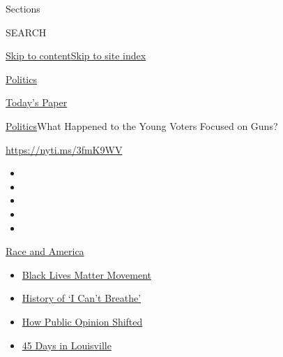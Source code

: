 Sections

SEARCH

\protect\hyperlink{site-content}{Skip to
content}\protect\hyperlink{site-index}{Skip to site index}

\href{https://www.nytimes3xbfgragh.onion/section/politics}{Politics}

\href{https://myaccount.nytimes3xbfgragh.onion/auth/login?response_type=cookie\&client_id=vi}{}

\href{https://www.nytimes3xbfgragh.onion/section/todayspaper}{Today's
Paper}

\href{/section/politics}{Politics}\textbar{}What Happened to the Young
Voters Focused on Guns?

\url{https://nyti.ms/3fmK9WV}

\begin{itemize}
\item
\item
\item
\item
\item
\end{itemize}

\href{https://www.nytimes3xbfgragh.onion/news-event/george-floyd-protests-minneapolis-new-york-los-angeles?action=click\&pgtype=Article\&state=default\&region=TOP_BANNER\&context=storylines_menu}{Race
and America}

\begin{itemize}
\tightlist
\item
  \href{https://www.nytimes3xbfgragh.onion/interactive/2020/07/03/us/george-floyd-protests-crowd-size.html?action=click\&pgtype=Article\&state=default\&region=TOP_BANNER\&context=storylines_menu}{Black
  Lives Matter Movement}
\item
  \href{https://www.nytimes3xbfgragh.onion/interactive/2020/06/28/us/i-cant-breathe-police-arrest.html?action=click\&pgtype=Article\&state=default\&region=TOP_BANNER\&context=storylines_menu}{History
  of `I Can't Breathe'}
\item
  \href{https://www.nytimes3xbfgragh.onion/interactive/2020/06/10/upshot/black-lives-matter-attitudes.html?action=click\&pgtype=Article\&state=default\&region=TOP_BANNER\&context=storylines_menu}{How
  Public Opinion Shifted}
\item
  \href{https://www.nytimes3xbfgragh.onion/interactive/2020/07/16/us/black-lives-matter-protests-louisville-breonna-taylor.html?action=click\&pgtype=Article\&state=default\&region=TOP_BANNER\&context=storylines_menu}{45
  Days in Louisville}
\end{itemize}

